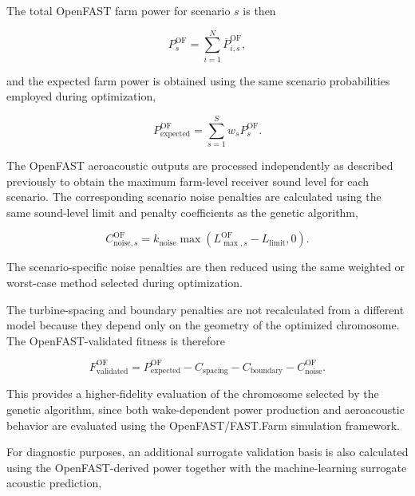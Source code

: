 \documentclass[11pt]{article}
\begin{document}
The total OpenFAST farm power for scenario $s$ is then

\begin{equation}
    P_{s}^{\mathrm{OF}}
    =
    \sum_{i=1}^{N}
    \overline{P}_{i,s}^{\mathrm{OF}},
    \label{eq:openfast-scenario-power}
\end{equation}

and the expected farm power is obtained using the same scenario probabilities employed during optimization,

\begin{equation}
    P_{\mathrm{expected}}^{\mathrm{OF}}
    =
    \sum_{s=1}^{S}
    w_s P_s^{\mathrm{OF}}.
    \label{eq:openfast-expected-power}
\end{equation}

The OpenFAST aeroacoustic outputs are processed independently as described previously to obtain the maximum farm-level receiver sound level for each scenario. The corresponding scenario noise penalties are calculated using the same sound-level limit and penalty coefficients as the genetic algorithm,

\begin{equation}
    C_{\mathrm{noise},s}^{\mathrm{OF}}
    =
    k_{\mathrm{noise}}
    \max
    \left(
        L_{\max,s}^{\mathrm{OF}}
        -
        L_{\mathrm{limit}},
        0
    \right).
\end{equation}

The scenario-specific noise penalties are then reduced using the same weighted or worst-case method selected during optimization.

The turbine-spacing and boundary penalties are not recalculated from a different model because they depend only on the geometry of the optimized chromosome. The OpenFAST-validated fitness is therefore

\begin{equation}
    F_{\mathrm{validated}}^{\mathrm{OF}}
    =
    P_{\mathrm{expected}}^{\mathrm{OF}}
    -
    C_{\mathrm{spacing}}
    -
    C_{\mathrm{boundary}}
    -
    C_{\mathrm{noise}}^{\mathrm{OF}}.
    \label{eq:openfast-validated-fitness}
\end{equation}

This provides a higher-fidelity evaluation of the chromosome selected by the genetic algorithm, since both wake-dependent power production and aeroacoustic behavior are evaluated using the OpenFAST/FAST.Farm simulation framework.

For diagnostic purposes, an additional surrogate validation basis is also calculated using the OpenFAST-derived power together with the machine-learning surrogate acoustic prediction,
\end{document}
